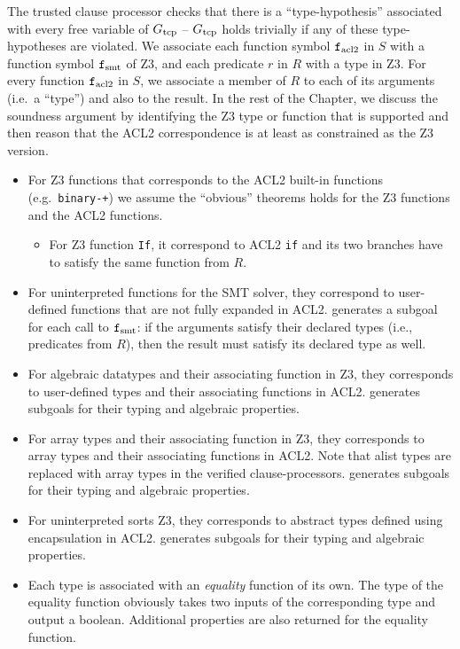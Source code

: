 The trusted clause processor checks that there is a ``type-hypothesis'' associated
with every free variable of $G_{\mathrm{tcp}}$ -- $G_{\mathrm{tcp}}$ holds trivially if any of these
type-hypotheses are violated.
We associate each function symbol $\mathtt{f}_{\mathrm{acl2}}$ in $S$ with a function symbol $\mathtt{f}_{\mathrm{smt}}$
of Z3, and each predicate $r$ in $R$ with a type in Z3.
For every function $\mathtt{f}_{\mathrm{acl2}}$ in $S$, we associate a member of $R$ to each of its
arguments (i.e.\ a ``type'') and also to the result.
In the rest of the Chapter, we discuss the soundness argument by identifying the
Z3 type or function that is supported and then reason that the ACL2
correspondence is at least as constrained as the Z3 version.
\begin{itemize}
\item For Z3 functions that corresponds to the ACL2 built-in functions (e.g.\
  \texttt{binary-+}) we assume the ``obvious'' theorems holds for the Z3
  functions and the ACL2 functions.
  \begin{itemize}
  \item For Z3 function \texttt{If}, it correspond to ACL2 \texttt{if} and its
    two branches have to satisfy the same function from $R$.
  \end{itemize}
\item For uninterpreted functions for the \acs{SMT} solver, they correspond to
  user-defined functions that are not fully expanded in ACL2.
  \smtlink{} generates a subgoal for each call to $\mathtt{f}_{\mathrm{smt}}$: if the arguments
  satisfy their declared types (i.e., predicates from $R$), then the  result
  must satisfy its declared type as well.
\item For algebraic datatypes and their associating function in Z3, they
  corresponds to user-defined types and their associating functions in ACL2.
  \smtlink{} generates subgoals for their typing and algebraic properties.
\item For array types and their associating function in Z3, they
  corresponds to array types and their associating functions in ACL2.
  Note that alist types are replaced with array types in the verified
  clause-processors.
  \smtlink{} generates subgoals for their typing and algebraic properties.
\item For uninterpreted sorts Z3, they corresponds to abstract types defined
  using encapsulation in ACL2.
  \smtlink{} generates subgoals for their typing and algebraic properties.
\item Each type is associated with an \emph{equality} function of its own. The
  type of the equality function obviously takes two inputs of the corresponding
  type and output a boolean.
  Additional properties are also returned for the equality function.
\end{itemize}

